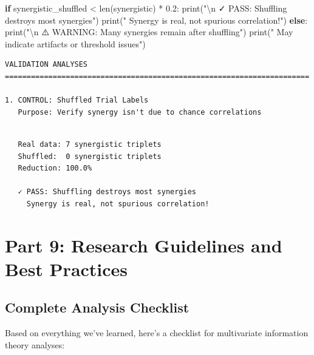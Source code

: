 \documentclass[
  11pt,
  letterpaper,
  oneside,
  openany]{book}
\newenvironment{Shaded}{\begin{snugshade}}{\end{snugshade}}
\newcommand{\BuiltInTok}[1]{\textcolor[rgb]{0.00,0.23,0.31}{#1}}
\newcommand{\CharTok}[1]{\textcolor[rgb]{0.13,0.47,0.30}{#1}}
\newcommand{\ControlFlowTok}[1]{\textcolor[rgb]{0.00,0.23,0.31}{\textbf{#1}}}
\newcommand{\FloatTok}[1]{\textcolor[rgb]{0.68,0.00,0.00}{#1}}
\newcommand{\NormalTok}[1]{\textcolor[rgb]{0.00,0.23,0.31}{#1}}
\newcommand{\OperatorTok}[1]{\textcolor[rgb]{0.37,0.37,0.37}{#1}}
\newcommand{\StringTok}[1]{\textcolor[rgb]{0.13,0.47,0.30}{#1}}
\begin{document}
\begin{Shaded}
\begin{Highlighting}[]
\ControlFlowTok{if}\NormalTok{ synergistic\_shuffled }\OperatorTok{\textless{}} \BuiltInTok{len}\NormalTok{(synergistic) }\OperatorTok{*} \FloatTok{0.2}\NormalTok{:}
    \BuiltInTok{print}\NormalTok{(}\StringTok{"}\CharTok{\textbackslash{}n}\StringTok{   ✓ PASS: Shuffling destroys most synergies"}\NormalTok{)}
    \BuiltInTok{print}\NormalTok{(}\StringTok{"     Synergy is real, not spurious correlation!"}\NormalTok{)}
\ControlFlowTok{else}\NormalTok{:}
    \BuiltInTok{print}\NormalTok{(}\StringTok{"}\CharTok{\textbackslash{}n}\StringTok{   ⚠️  WARNING: Many synergies remain after shuffling"}\NormalTok{)}
    \BuiltInTok{print}\NormalTok{(}\StringTok{"     May indicate artifacts or threshold issues"}\NormalTok{)}
\end{Highlighting}
\end{Shaded}

\begin{verbatim}
VALIDATION ANALYSES
======================================================================

1. CONTROL: Shuffled Trial Labels
   Purpose: Verify synergy isn't due to chance correlations
\end{verbatim}

\begin{verbatim}

   Real data: 7 synergistic triplets
   Shuffled:  0 synergistic triplets
   Reduction: 100.0%

   ✓ PASS: Shuffling destroys most synergies
     Synergy is real, not spurious correlation!
\end{verbatim}

\section{Part 9: Research Guidelines and Best
Practices}\label{part-9-research-guidelines-and-best-practices}

\subsection{Complete Analysis
Checklist}\label{complete-analysis-checklist}

Based on everything we've learned, here's a checklist for multivariate
information theory analyses:
\end{document}
